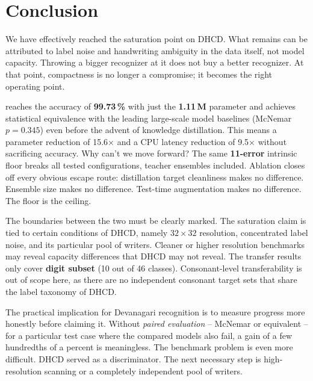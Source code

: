 \section{Conclusion}
\label{sec:conclusion}

We have effectively reached the saturation point on DHCD. What remains can be
attributed to label noise and handwriting ambiguity in the data itself, not model
capacity. Throwing a bigger recognizer at it does not buy a better recognizer.
At that point, compactness is no longer a compromise; it becomes the right operating point.

\modelname{} reaches the accuracy of \textbf{99.73\,\%} with just the \textbf{1.11\,M} parameter and achieves statistical equivalence with the leading large-scale model baselines (McNemar $p = 0.345$) even before the advent of knowledge distillation. This means a parameter reduction of 15.6$\times$ and a CPU latency reduction of 9.5$\times$ without sacrificing accuracy. Why can't we move forward? The same \textbf{11-error} intrinsic floor breaks all tested configurations, teacher ensembles included. Ablation closes off every obvious escape route: distillation target cleanliness makes no difference. Ensemble size makes no difference. Test-time augmentation makes no difference. The floor is the ceiling.

The boundaries between the two must be clearly marked. The saturation claim is tied to certain conditions of DHCD, namely $32{\times}32$ resolution, concentrated label noise, and its particular pool of writers. Cleaner or higher resolution benchmarks may reveal capacity differences that DHCD may not reveal. The transfer results only cover \textbf{digit subset} (10 out of 46 classes). Consonant-level transferability is out of scope here, as there are no independent consonant target sets that share the label taxonomy of DHCD.

The practical implication for Devanagari recognition is to measure progress more honestly before claiming it. Without \emph{paired evaluation} -- McNemar or equivalent -- for a particular test case where the compared models also fail, a gain of a few hundredths of a percent is meaningless. The benchmark problem is even more difficult. DHCD served as a discriminator. The next necessary step is high-resolution scanning or a completely independent pool of writers.